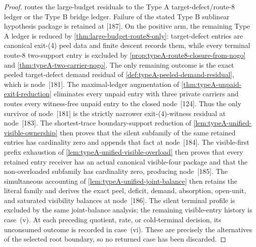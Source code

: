 \documentclass[11pt]{article}
\begin{document}
\begin{proof}
 routes the large-budget residuals to the Type A
target-defect/route-8 ledger or the Type B bridge ledger.  Failure of the
stated Type B sublinear hypothesis package is retained at [187].  On the
positive arm, the remaining Type A ledger is reduced by
\cref{thm:large-budget-route8-only}: target-defect entries are canonical
exit-\textup{(4)} peel data and finite descent records them, while every
terminal route-8 two-support entry is excluded by
\cref{prop:typeA-route8-closure-from-nogo} and
\cref{thm:typeA-two-carrier-nogo}.  The only remaining outcome is the exact
peeled target-defect demand residual of
\cref{def:typeA-peeled-demand-residual}, which is node~[181].  The maximal-ledger
augmentation of \cref{thm:typeA-unpaid-exit4-reduction} eliminates every
unpaid entry with three private carriers and routes every witness-free unpaid
entry to the closed node~[124].  Thus the only survivor of node~[181] is the
strictly narrower exit-\textup{(4)}-witness residual at node~[183].  The
shortest-trace boundary-support reduction of
\cref{lem:typeA-unified-visible-ownership} then proves that the silent
subfamily of the same retained entries has cardinality zero and appends that
fact at node~[184].  The visible-first prefix exhaustion of
\cref{lem:typeA-unified-visible-overload} then proves that every retained
entry receiver has an actual canonical visible-four package and that the
non-overloaded subfamily has cardinality zero, producing node~[185].
The simultaneous accounting of
\cref{lem:typeA-unified-joint-balance} then retains the literal family and
derives the exact peel, deficit, demand, absorption, open-unit, and saturated
visibility balances at node~[186].
The silent terminal profile is excluded by the same joint-balance analysis;
the remaining visible-entry history is case~\textup{(v)}.  At each preceding
quotient, rate, or cold-terminal decision, its unconsumed outcome is recorded
in case~\textup{(vi)}.  These are precisely the alternatives of the selected
root boundary, so no returned case has been discarded.
\end{proof}
\end{document}

